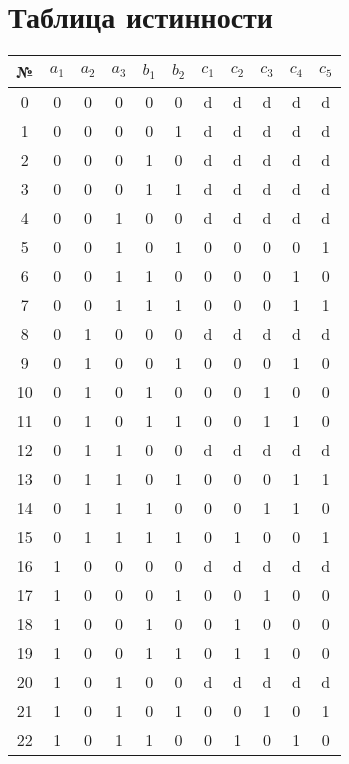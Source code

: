 \documentclass{article}
\begin{document}
\section*{Таблица истинности}
\begin{center}\begin{tabular}{|c|ccc|cc|ccccc|}
    \hline № & $a_1$ & $a_2$ & $a_3$ & $b_1$ & $b_2$ & $c_1$ & $c_2$ & $c_3$ & $c_4$ & $c_5$ \\ \hline
    0 & 0 & 0 & 0 & 0 & 0 & d & d & d & d & d \\ \hline
    1 & 0 & 0 & 0 & 0 & 1 & d & d & d & d & d \\ \hline
    2 & 0 & 0 & 0 & 1 & 0 & d & d & d & d & d \\ \hline
    3 & 0 & 0 & 0 & 1 & 1 & d & d & d & d & d \\ \hline
    4 & 0 & 0 & 1 & 0 & 0 & d & d & d & d & d \\ \hline
    5 & 0 & 0 & 1 & 0 & 1 & 0 & 0 & 0 & 0 & 1 \\ \hline
    6 & 0 & 0 & 1 & 1 & 0 & 0 & 0 & 0 & 1 & 0 \\ \hline
    7 & 0 & 0 & 1 & 1 & 1 & 0 & 0 & 0 & 1 & 1 \\ \hline
    8 & 0 & 1 & 0 & 0 & 0 & d & d & d & d & d \\ \hline
    9 & 0 & 1 & 0 & 0 & 1 & 0 & 0 & 0 & 1 & 0 \\ \hline
    10 & 0 & 1 & 0 & 1 & 0 & 0 & 0 & 1 & 0 & 0 \\ \hline
    11 & 0 & 1 & 0 & 1 & 1 & 0 & 0 & 1 & 1 & 0 \\ \hline
    12 & 0 & 1 & 1 & 0 & 0 & d & d & d & d & d \\ \hline
    13 & 0 & 1 & 1 & 0 & 1 & 0 & 0 & 0 & 1 & 1 \\ \hline
    14 & 0 & 1 & 1 & 1 & 0 & 0 & 0 & 1 & 1 & 0 \\ \hline
    15 & 0 & 1 & 1 & 1 & 1 & 0 & 1 & 0 & 0 & 1 \\ \hline
    16 & 1 & 0 & 0 & 0 & 0 & d & d & d & d & d \\ \hline
    17 & 1 & 0 & 0 & 0 & 1 & 0 & 0 & 1 & 0 & 0 \\ \hline
    18 & 1 & 0 & 0 & 1 & 0 & 0 & 1 & 0 & 0 & 0 \\ \hline
    19 & 1 & 0 & 0 & 1 & 1 & 0 & 1 & 1 & 0 & 0 \\ \hline
    20 & 1 & 0 & 1 & 0 & 0 & d & d & d & d & d \\ \hline
    21 & 1 & 0 & 1 & 0 & 1 & 0 & 0 & 1 & 0 & 1 \\ \hline
    22 & 1 & 0 & 1 & 1 & 0 & 0 & 1 & 0 & 1 & 0 \\ \hline

\end{tabular}
\end{center}
\end{document}
